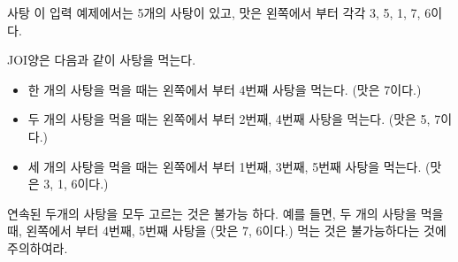 \begin{problem}{사탕}
	이 입력 예제에서는 5개의 사탕이 있고, 맛은 왼쪽에서 부터 각각 3, 5, 1, 7, 6이다.
	
	JOI양은 다음과 같이 사탕을 먹는다.
	
	\begin{itemize}
		\item 한 개의 사탕을 먹을 때는 왼쪽에서 부터 4번째 사탕을 먹는다. (맛은 7이다.)
		\item 두 개의 사탕을 먹을 때는 왼쪽에서 부터 2번째, 4번째 사탕을 먹는다. (맛은 5, 7이다.)
		\item 세 개의 사탕을 먹을 때는 왼쪽에서 부터 1번째, 3번째, 5번째 사탕을 먹는다. (맛은 3, 1, 6이다.)
	\end{itemize}

	연속된 두개의 사탕을 모두 고르는 것은 불가능 하다. 예를 들면, 두 개의 사탕을 먹을 때, 왼쪽에서 부터 4번째, 5번째 사탕을 (맛은 7, 6이다.) 먹는 것은 불가능하다는 것에 주의하여라.
	
	\begin{example}
	\end{example}
	
	
\end{problem}

